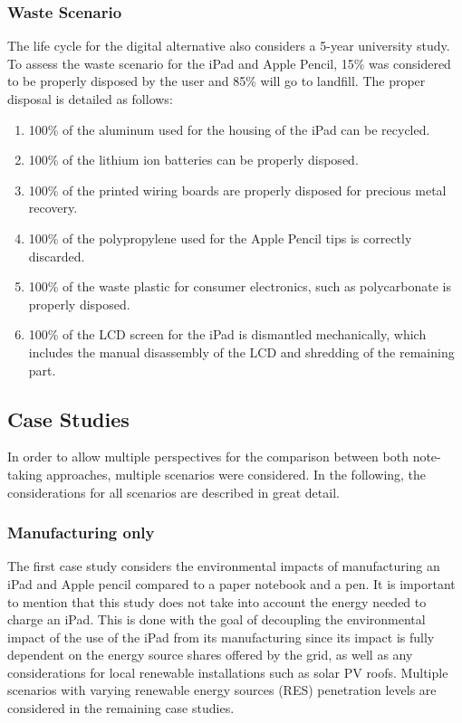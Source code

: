 \subsubsection*{Waste Scenario}
The life cycle for the digital alternative also considers a 5-year university study. To assess the waste scenario for the iPad and Apple Pencil, 15\% was considered to be properly disposed by the user and 85\% will go to landfill. The proper disposal is detailed as follows:

\begin{enumerate}
    \item 100\% of the aluminum used for the housing of the iPad can be recycled. 
    \item 100\% of the lithium ion batteries can be properly disposed. 
    \item 100\% of the printed wiring boards are properly disposed for precious metal recovery. 
    \item 100\% of the polypropylene used for the Apple Pencil tips is correctly discarded. 
    \item 100\% of the waste plastic for consumer electronics, such as polycarbonate is properly disposed. 
    \item 100\% of the LCD screen for the iPad is dismantled mechanically, which includes the manual disassembly of the LCD and shredding of the remaining part. 
\end{enumerate}

\subsection{Case Studies}\label{subsec:case_studies}
In order to allow multiple perspectives for the comparison between both note-taking approaches, multiple scenarios were considered. In the following, the considerations for all scenarios are described in great detail.

\subsubsection*{Manufacturing only}
The first case study considers the environmental impacts of manufacturing an iPad and Apple pencil compared to a paper notebook and a pen. It is important to mention that this study does not take into account the energy needed to charge an iPad. This is done with the goal of decoupling the environmental impact of the use of the iPad from its manufacturing since its impact is fully dependent on the energy source shares offered by the grid, as well as any considerations for local renewable installations such as solar PV roofs. Multiple scenarios with varying renewable energy sources (RES) penetration levels are considered in the remaining case studies. 

